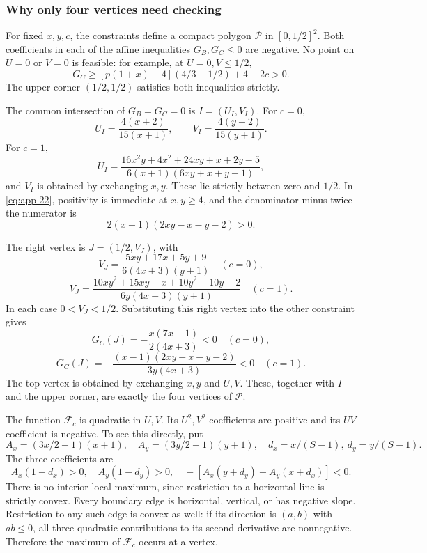 \documentclass[11pt,letterpaper]{article}
\theoremstyle{plain}
\begin{document}
\subsubsection*{Why only four vertices need checking}\label{why-only-four-vertices-need-checking}

For fixed \(x,y,c\), the constraints define a compact polygon \(\mathcal P\) in \([0,1/2]^2\). Both coefficients in each of the affine inequalities \(G_B,G_C\le0\) are negative. No point on \(U=0\) or \(V=0\) is feasible: for example, at \(U=0,V\le1/2\), \[
G_C\ge[p(1+x)-4](4/3-1/2)+4-2c>0.
\] The upper corner \((1/2,1/2)\) satisfies both inequalities strictly.

The common intersection of \(G_B=G_C=0\) is \(I=(U_I,V_I)\). For \(c=0\), \[
U_I=\frac{4(x+2)}{15(x+1)},\qquad
V_I=\frac{4(y+2)}{15(y+1)}.
\tag{B.21}\label{eq:app-21}
\] For \(c=1\), \[
U_I=\frac{16x^2y+4x^2+24xy+x+2y-5}
 {6(x+1)(6xy+x+y-1)},
\tag{B.22}\label{eq:app-22}
\] and \(V_I\) is obtained by exchanging \(x,y\). These lie strictly between zero and \(1/2\). In \eqref{eq:app-22}, positivity is immediate at \(x,y\ge4\), and the denominator minus twice the numerator is \[
2(x-1)(2xy-x-y-2)>0.
\]

The right vertex is \(J=(1/2,V_J)\), with \[
V_J=\frac{5xy+17x+5y+9}{6(4x+3)(y+1)}\quad(c=0),
\tag{B.23}\label{eq:app-23}
\] \[
V_J=\frac{10xy^2+15xy-x+10y^2+10y-2}
 {6y(4x+3)(y+1)}\quad(c=1).
\tag{B.24}\label{eq:app-24}
\] In each case \(0<V_J<1/2\). Substituting this right vertex into the other constraint gives \[
G_C(J)=-\frac{x(7x-1)}{2(4x+3)}<0\quad(c=0),
\] \[
G_C(J)=-\frac{(x-1)(2xy-x-y-2)}{3y(4x+3)}<0\quad(c=1).
\] The top vertex is obtained by exchanging \(x,y\) and \(U,V\). These, together with \(I\) and the upper corner, are exactly the four vertices of \(\mathcal P\).

The function \(\mathcal F_c\) is quadratic in \(U,V\). Its \(U^2,V^2\) coefficients are positive and its \(UV\) coefficient is negative. To see this directly, put \[
A_x=(3x/2+1)(x+1),\quad A_y=(3y/2+1)(y+1),
\quad d_x=x/(S-1),\ d_y=y/(S-1).
\] The three coefficients are \[
A_x(1-d_x)>0,\quad A_y(1-d_y)>0,
\quad-[A_x(y+d_y)+A_y(x+d_x)]<0.
\] There is no interior local maximum, since restriction to a horizontal line is strictly convex. Every boundary edge is horizontal, vertical, or has negative slope. Restriction to any such edge is convex as well: if its direction is \((a,b)\) with \(ab\le0\), all three quadratic contributions to its second derivative are nonnegative. Therefore the maximum of \(\mathcal F_c\) occurs at a vertex.
\end{document}
